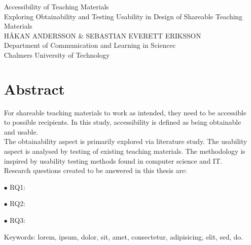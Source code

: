 Accessibility of Teaching Materials\\
Exploring Obtainability and Testing Usability in Design of Shareable Teaching Materials\\
HÅKAN ANDERSSON \& SEBASTIAN EVERETT ERIKSSON\\
Department of Communication and Learning in Sciencec\\
Chalmers University of Technology \setlength{\parskip}{0.5cm}

\thispagestyle{plain}			%
\setlength{\parskip}{0pt plus 1.0pt}
\section*{Abstract}
For shareable teaching materials to work as intended, they need to be accessible to possible recipients. In this study, accessibility is defined as being obtainable and usable. \\[0.5cm]
The obtainability aspect is primarily explored via literature study. The usability aspect is analysed by testing of existing teaching materials. The methodology is inspired by usability testing methods found in computer science and IT. \\[0.5cm]
Research questions created to be answered in this thesis are:
\begin{description}
    \item $\bullet$ RQ1:
    \item $\bullet$ RQ2:
    \item $\bullet$ RQ3:
\end{description}

\vfill
Keywords: lorem, ipsum, dolor, sit, amet, consectetur, adipisicing, elit, sed, do.

\newpage				%
\thispagestyle{empty}
\mbox{}